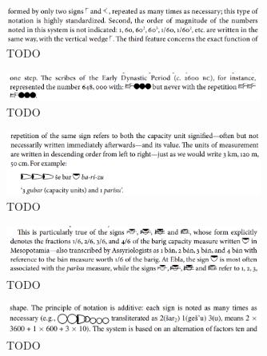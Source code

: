 \documentclass[10pt, a4paper, twoside]{article}
\begin{document}
\begin{figure}
  \begin{center}
  \includegraphics[width=0.75\textwidth]{chambon-58.png}
  \caption{TODO \cite[58]{Chambon2012}\label{chambon58}}
  \end{center}
\end{figure}
\begin{figure}
  \begin{center}
  \includegraphics[width=0.75\textwidth]{chambon-59.png}
  \caption[TODO]{TODO \cite[59]{Chambon2012}\label{chambon59}\footnotemark}
  \end{center}
\end{figure}
\begin{figure}
  \begin{center}
  \includegraphics[width=0.75\textwidth]{chambon-61.png}
  \caption{TODO \cite[61]{Chambon2012}\label{chambon61}}
  \end{center}
\end{figure}
\begin{figure}
  \begin{center}
  \includegraphics[width=0.75\textwidth]{chambon-63.png}
  \caption{TODO \cite[64]{Chambon2012}\label{chambon64}}
  \end{center}
\end{figure}

\begin{figure}
  \begin{center}
  \includegraphics[width=0.75\textwidth]{proust-350.png}
  \caption{TODO\label{proust350}}
  \end{center}
\end{figure}
\end{document}
